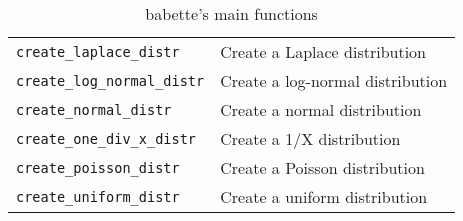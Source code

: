 \begin{table}[h]
\begin{tabular}{ | l | l | }
\verb;create_laplace_distr; & Create a Laplace distribution \\
\verb;create_log_normal_distr; & Create a log-normal distribution \\
\verb;create_normal_distr; & Create a normal distribution \\
\verb;create_one_div_x_distr; & Create a 1/X distribution \\
\verb;create_poisson_distr; & Create a Poisson distribution \\
\verb;create_uniform_distr; & Create a uniform distribution \\
\hline
\end{tabular}
\caption{babette's main functions}
\label{tab:functions}
\end{table}
